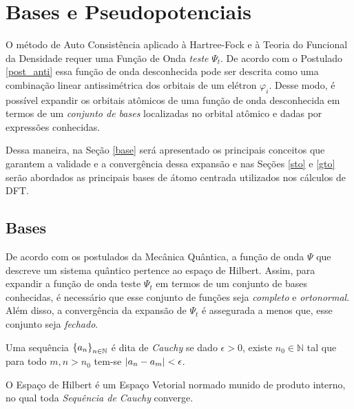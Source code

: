 \chapter{Bases e Pseudopotenciais\label{apd:bases}}
O método de Auto Consistência aplicado à Hartree-Fock e à Teoria do Funcional da Densidade requer uma Função de Onda \textit{teste} $ \Psi_t $. De acordo com o Postulado \ref{post_anti} essa função de onda desconhecida pode ser descrita como uma combinação linear antissimétrica dos orbitais de um elétron $ \varphi_i $. Desse modo, é possível expandir os orbitais atômicos de uma função de onda desconhecida em termos de um \textit{conjunto de bases} localizadas no orbital atômico e dadas por expressões conhecidas. 

Dessa maneira, na Seção \ref{base} será apresentado os principais conceitos que garantem a validade e a convergência dessa expansão e nas Seções \ref{sto} e \ref{gto} serão abordados as principais bases de átomo centrada utilizados nos cálculos de DFT.

\section{Bases\label{base}}
De acordo com os postulados da Mecânica Quântica, a função de onda $ \Psi $ que descreve um sistema quântico pertence ao espaço de Hilbert. Assim, para expandir a função de onda teste $ \Psi_t $ em termos de um conjunto de bases conhecidas, é necessário que esse conjunto de funções seja \textit{completo} e \textit{ortonormal}. Além disso, a convergência da expansão de $ \Psi_t $ é assegurada a menos que, esse conjunto seja \textit{fechado}.

\begin{mydef}
	Uma sequência $ \Bqty{a_n}_{n\in\mathbb{N}} $ é dita de \textit{Cauchy} se dado $ \epsilon>0 $, existe $ n_{0} \in \mathbb{N} $ tal que para todo $ m,n>n_{0}$ tem-se $ \abs{a_n-a_m}<\epsilon $.
\end{mydef}
\begin{mydef}
	O Espaço de Hilbert é um Espaço Vetorial normado munido de produto interno, no qual toda \textit{Sequência de Cauchy} converge.
\end{mydef}

